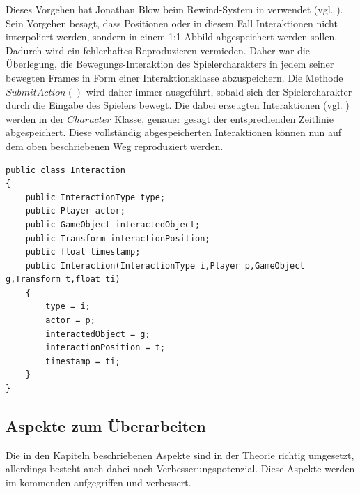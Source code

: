 Dieses Vorgehen hat Jonathan Blow beim Rewind-System in  verwendet (vgl. \cite{gdc_implementation_2016}). Sein Vorgehen besagt, dass Positionen oder in diesem Fall Interaktionen nicht interpoliert werden, sondern in einem 1:1 Abbild abgespeichert werden sollen. Dadurch wird ein fehlerhaftes Reproduzieren vermieden. Daher war die Überlegung, die Bewegungs-Interaktion des Spielercharakters in jedem seiner bewegten Frames in Form einer Interaktionsklasse abzuspeichern. Die Methode $SubmitAction()$ wird daher immer ausgeführt, sobald sich der Spielercharakter durch die Eingabe des Spielers bewegt. Die dabei erzeugten Interaktionen (vgl. ) werden in der $Character$ Klasse, genauer gesagt der entsprechenden Zeitlinie abgespeichert. Diese vollständig abgespeicherten Interaktionen können nun auf dem oben beschriebenen Weg reproduziert werden.

\begin{lstlisting}[caption={Interaktionsklasse}, label={sec:interaction_old}]
public class Interaction
{
    public InteractionType type;
    public Player actor;
    public GameObject interactedObject;
    public Transform interactionPosition;
    public float timestamp;
    public Interaction(InteractionType i,Player p,GameObject g,Transform t,float ti)
    {
        type = i;
        actor = p;
        interactedObject = g;
        interactionPosition = t;
        timestamp = ti;
    }
}

\end{lstlisting}

\subsection{Aspekte zum Überarbeiten}
Die in den Kapiteln  beschriebenen Aspekte sind in der Theorie richtig umgesetzt, allerdings besteht auch dabei noch Verbesserungspotenzial. Diese Aspekte werden im kommenden  aufgegriffen und verbessert.
\newpage
